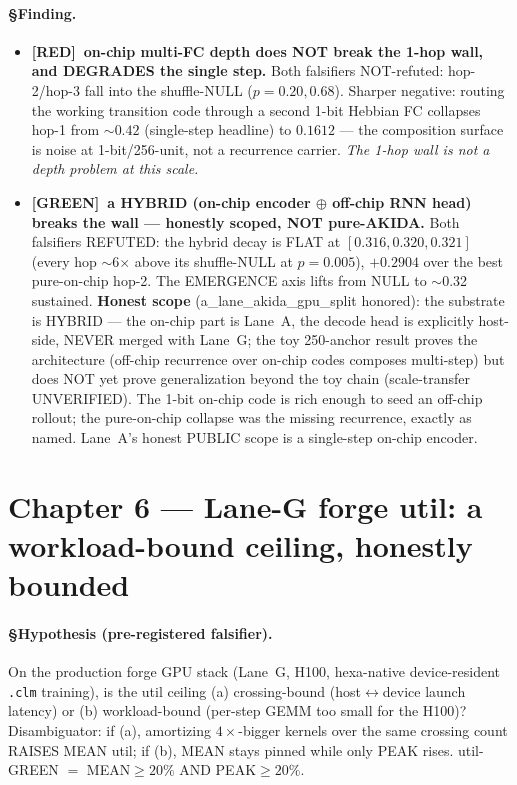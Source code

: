\documentclass[11pt,a4paper]{article}
\providecommand{\tierGreen}{[GREEN]}
\providecommand{\tierRed}{[RED]}
\begin{document}
\paragraph{§Finding.}
\begin{itemize}\itemsep0.2em
\item \textbf{\tierRed\ on-chip multi-FC depth does NOT break the 1-hop wall, and
DEGRADES the single step.} Both falsifiers NOT-refuted: hop-2/hop-3 fall into the
shuffle-NULL ($p=0.20,0.68$). Sharper negative: routing the working transition code
through a second 1-bit Hebbian FC collapses hop-1 from $\sim0.42$ (single-step
headline) to $0.1612$ --- the composition surface is noise at 1-bit/256-unit, not a
recurrence carrier. \emph{The 1-hop wall is not a depth problem at this scale.}
\item \textbf{\tierGreen\ a HYBRID (on-chip encoder $\oplus$ off-chip RNN head)
breaks the wall --- honestly scoped, NOT pure-AKIDA.} Both falsifiers REFUTED:
the hybrid decay is FLAT at $[0.316,0.320,0.321]$ (every hop $\sim$6$\times$ above
its shuffle-NULL at $p=0.005$), $+0.2904$ over the best pure-on-chip hop-2. The
EMERGENCE axis lifts from NULL to $\sim$0.32 sustained. \textbf{Honest scope}
(a\_lane\_akida\_gpu\_split honored): the substrate is HYBRID --- the on-chip part is
Lane~A, the decode head is explicitly host-side, NEVER merged with Lane~G; the toy
250-anchor result proves the architecture (off-chip recurrence over on-chip codes
composes multi-step) but does NOT yet prove generalization beyond the toy chain
(scale-transfer UNVERIFIED). The 1-bit on-chip code is rich enough to seed an
off-chip rollout; the pure-on-chip collapse was the missing recurrence, exactly as
named. Lane~A's honest PUBLIC scope is a single-step on-chip encoder.
\end{itemize}

\section{Chapter 6 --- Lane-G forge util: a workload-bound ceiling, honestly bounded}
\label{sec:laneg}

\paragraph{§Hypothesis (pre-registered falsifier).} On the production forge GPU
stack (Lane~G, H100, hexa-native device-resident \texttt{.clm} training), is the
util ceiling (a) crossing-bound (host$\leftrightarrow$device launch latency) or (b)
workload-bound (per-step GEMM too small for the H100)? Disambiguator: if (a),
amortizing $4\times$-bigger kernels over the same crossing count RAISES MEAN util;
if (b), MEAN stays pinned while only PEAK rises. util-GREEN $=$ MEAN$\ge20\%$ AND
PEAK$\ge20\%$.
\end{document}
